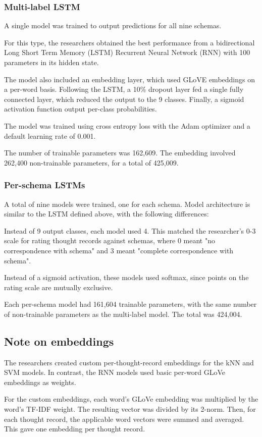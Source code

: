 \documentclass[11pt,a4paper]{article}
\begin{document}
\subsubsection{Multi-label LSTM}
\label{multi_lstm}
A single model was trained to output predictions for all nine schemas.

For this type, the researchers obtained the best performance from a bidirectional Long Short Term Memory (LSTM) Recurrent Neural Network (RNN) with 100 parameters in its hidden state.

The model also included an embedding layer, which used GLoVE embeddings on a per-word basis. Following the LSTM, a 10\% dropout layer fed a single fully connected layer, which reduced the output to the 9 classes. Finally, a sigmoid activation function output per-class probabilities. 

The model was trained using cross entropy loss with the Adam optimizer and a default learning rate of 0.001.

The number of trainable parameters was 162,609. The embedding involved 262,400 non-trainable parameters, for a total of 425,009.

\subsubsection{Per-schema LSTMs}
A total of nine models were trained, one for each schema. Model architecture is similar to the LSTM defined above, with the following differences:

Instead of 9 output classes, each model used 4. This matched the researcher's 0-3 scale for rating thought records against schemas, where 0 meant "no correspondence with schema" and 3 meant "complete correspondence with schema".

Instead of a sigmoid activation, these models used softmax, since points on the rating scale are mutually exclusive.

Each per-schema model had 161,604 trainable parameters, with the same number of non-trainable parameters as the multi-label model. The total was 424,004.

\subsection{Note on embeddings}
The researchers created custom per-thought-record embeddings for the kNN and SVM models. In contrast, the RNN models used basic per-word GLoVe embeddings as weights.

For the custom embeddings, each word's GLoVe embedding was multiplied by the word's TF-IDF weight. The resulting vector was divided by its 2-norm. Then, for each thought record, the applicable word vectors were summed and averaged. This gave one embedding per thought record.
\end{document}
